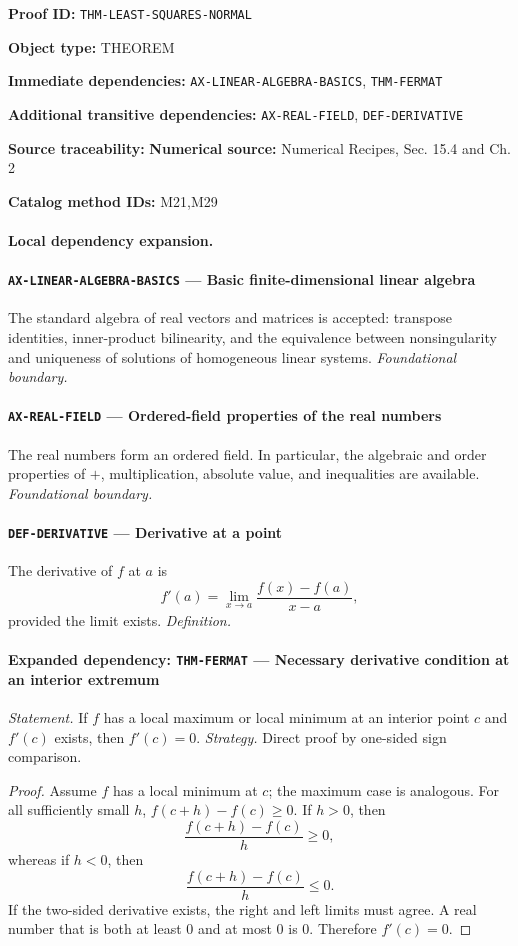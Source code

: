 \documentclass[10pt]{article}
\newcommand{\pidraw}[1]{\begingroup\urlstyle{tt}\nolinkurl{#1}\endgroup}
\theoremstyle{definition}
\theoremstyle{remark}
\newcommand{\meta}[2]{\noindent\textbf{#1:} #2\par}
\begin{document}
\meta{Proof ID}{\pidraw{THM-LEAST-SQUARES-NORMAL}}
\meta{Object type}{THEOREM}
\meta{Immediate dependencies}{\pidraw{AX-LINEAR-ALGEBRA-BASICS}, \pidraw{THM-FERMAT}}
\meta{Additional transitive dependencies}{\pidraw{AX-REAL-FIELD}, \pidraw{DEF-DERIVATIVE}}
\meta{Source traceability}{\textbf{Numerical source:} Numerical Recipes, Sec. 15.4 and Ch. 2}
\meta{Catalog method IDs}{M21,M29}

\paragraph{Local dependency expansion.}

\paragraph{\pidraw{AX-LINEAR-ALGEBRA-BASICS} --- Basic finite-dimensional linear algebra}
The standard algebra of real vectors and matrices is accepted: transpose identities, inner-product bilinearity, and the equivalence between nonsingularity and uniqueness of solutions of homogeneous linear systems.
\textit{Foundational boundary.}

\paragraph{\pidraw{AX-REAL-FIELD} --- Ordered-field properties of the real numbers}
The real numbers form an ordered field. In particular, the algebraic and order properties of $+$, multiplication, absolute value, and inequalities are available.
\textit{Foundational boundary.}

\paragraph{\pidraw{DEF-DERIVATIVE} --- Derivative at a point}
The derivative of $f$ at $a$ is
\[
f'(a)=\lim_{x\to a}\frac{f(x)-f(a)}{x-a},
\]
provided the limit exists.
\textit{Definition.}

\paragraph{Expanded dependency: \pidraw{THM-FERMAT} --- Necessary derivative condition at an interior extremum}
\textit{Statement.} If $f$ has a local maximum or local minimum at an interior point $c$ and $f'(c)$ exists, then $f'(c)=0$.
\textit{Strategy.} Direct proof by one-sided sign comparison.
\begin{proof}Assume $f$ has a local minimum at $c$; the maximum case is analogous.
For all sufficiently small $h$,
$f(c+h)-f(c)\ge0$. If $h>0$, then
\[
\frac{f(c+h)-f(c)}{h}\ge0,
\]
whereas if $h<0$, then
\[
\frac{f(c+h)-f(c)}{h}\le0.
\]
If the two-sided derivative exists, the right and left limits must agree.
A real number that is both at least $0$ and at most $0$ is $0$.
Therefore $f'(c)=0$.\end{proof}
\end{document}
